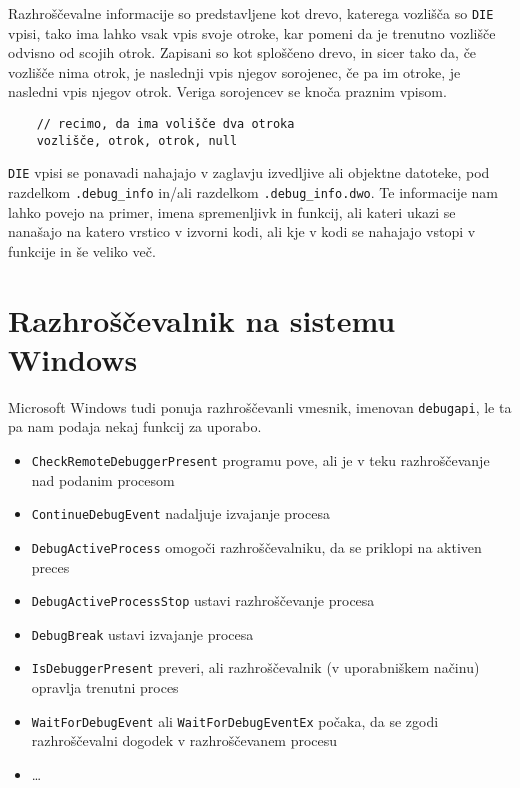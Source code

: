 \documentclass[a4paper,notitlepage]{article}
\newcommand{\code}[1]{\texttt{#1}}
\begin{document}
Razhroščevalne informacije so predstavljene kot drevo, katerega vozlišča so \code{DIE} vpisi, tako ima lahko vsak vpis svoje otroke, kar pomeni da je trenutno vozlišče odvisno od scojih otrok.
Zapisani so kot sploščeno drevo, in sicer tako da, če vozlišče nima otrok, je naslednji vpis njegov sorojenec, če pa im otroke, je nasledni vpis njegov otrok. Veriga sorojencev se knoča praznim vpisom.

\begin{verbatim}
    // recimo, da ima volišče dva otroka
    vozlišče, otrok, otrok, null
\end{verbatim}

\code{DIE} vpisi se ponavadi nahajajo v zaglavju izvedljive ali objektne datoteke, pod razdelkom \code{.debug_info} in/ali razdelkom \code{.debug_info.dwo}.
Te informacije nam lahko povejo na primer, imena spremenljivk in funkcij, ali kateri ukazi se nanašajo na katero vrstico v izvorni kodi, ali kje v kodi se nahajajo vstopi v funkcije in še veliko več.

\section{Razhroščevalnik na sistemu Windows}

Microsoft Windows tudi ponuja razhroščevanli vmesnik, imenovan \code{debugapi}\cite{win32-debugapi}, le ta pa nam podaja nekaj funkcij za uporabo.

\begin{itemize}
    \item \code{CheckRemoteDebuggerPresent} programu pove, ali je v teku razhroščevanje nad podanim procesom
    \item \code{ContinueDebugEvent} nadaljuje izvajanje procesa
    \item \code{DebugActiveProcess} omogoči razhroščevalniku, da se priklopi na aktiven preces
    \item \code{DebugActiveProcessStop} ustavi razhroščevanje procesa
    \item \code{DebugBreak} ustavi izvajanje procesa
    \item \code{IsDebuggerPresent} preveri, ali razhroščevalnik (v uporabniškem načinu) opravlja trenutni proces
    \item \code{WaitForDebugEvent} ali \code{WaitForDebugEventEx} počaka, da se zgodi razhroščevalni dogodek v razhroščevanem procesu
    \item \ldots
\end{itemize}
\end{document}

